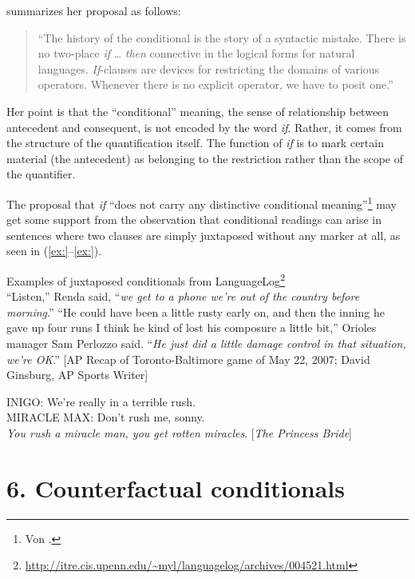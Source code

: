 \citet[11]{Kratzer1986} summarizes her proposal as follows:


\begin{quote}
“The history of the conditional is the story of a syntactic mistake. There is no two-place \textit{if} … \textit{then} connective in the logical forms for natural languages. \textit{If}-clauses are devices for restricting the domains of various operators. Whenever there is no explicit operator, we have to posit one.”
\end{quote}


Her point is that the “conditional” meaning, the sense of relationship between antecedent and consequent, is not encoded by the word \textit{if}. Rather, it comes from the structure of the quantification itself. The function of \textit{if} is to mark certain material (the antecedent) as belonging to the restriction rather than the scope of the quantifier.



The proposal that \textit{if} “does not carry any distinctive conditional meaning”\footnote{Von \citet{Fintel2011}.} may get some support from the observation that conditional readings can arise in sentences where two clauses are simply juxtaposed without any marker at all, as seen in (\ref{ex:}--\ref{ex:}).


\ea
Examples of juxtaposed conditionals from LanguageLog\footnote{\url{http://itre.cis.upenn.edu/~myl/languagelog/archives/004521.html}} \\
\ea “Listen,” Renda said, “\textit{we get to a phone we’re out of the country before morning}.”
\ex “He could have been a little rusty early on, and then the inning he gave up four runs I think he kind of lost his composure a little bit,” Orioles manager Sam Perlozzo said. “\textit{He just did a little damage control in that situation, we’re OK}.” [AP Recap of Toronto-Baltimore game of May 22, 2007; David Ginsburg, AP Sports Writer]
\z \z

\ea
INIGO: We’re really in a terrible rush.\\
MIRACLE MAX: Don’t rush me, sonny.\\
  \textit{You rush a miracle man, you get rotten miracles}.  [\textit{The Princess Bride}]
\z

\section{6. Counterfactual conditionals}\footnotemark{}\label{sec:}

